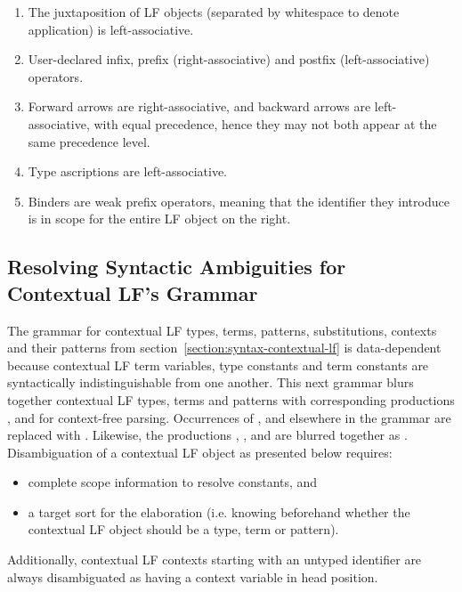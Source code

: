 \begin{enumerate}
\item The juxtaposition of \ac{LF} objects (separated by whitespace to denote application) is left-associative.
\item User-declared infix, prefix (right-associative) and postfix (left-associative) operators.
\item Forward arrows are right-associative, and backward arrows are left-associative, with equal precedence, hence they may not both appear at the same precedence level.
\item Type ascriptions are left-associative.
\item Binders are weak prefix operators, meaning that the identifier they introduce is in scope for the entire \ac{LF} object on the right.
\end{enumerate}

\subsection{Resolving Syntactic Ambiguities for Contextual \acs{LF}'s Grammar}

The grammar for contextual \ac{LF} types, terms, patterns, substitutions, contexts and their patterns from section~\ref{section:syntax-contextual-lf} is data-dependent because contextual \ac{LF} term variables, type constants and term constants are syntactically indistinguishable from one another.
This next grammar blurs together contextual \ac{LF} types, terms and patterns with corresponding productions ,  and  for context-free parsing.
Occurrences of ,  and  elsewhere in the grammar are replaced with .
Likewise, the productions , ,  and  are blurred together as .
Disambiguation of a contextual \ac{LF} object as presented below requires:
\begin{itemize}
\item complete scope information to resolve constants, and
\item a target sort for the elaboration (i.e. knowing beforehand whether the contextual \ac{LF} object should be a type, term or pattern).
\end{itemize}
Additionally, contextual \ac{LF} contexts starting with an untyped identifier are always disambiguated as having a context variable in head position.

